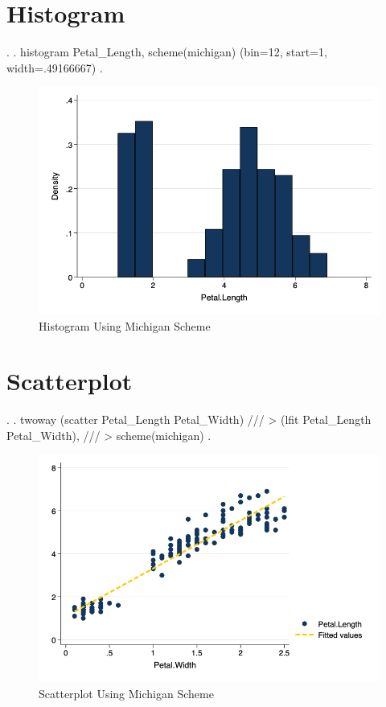 \documentclass[
]{article}
\begin{document}
\hypertarget{histogram}{%
\section{Histogram}\label{histogram}}

\begin{stlog}
. 
. histogram Petal_Length, scheme(michigan)
(bin=12, start=1, width=.49166667)
{\smallskip}
. 
\end{stlog}



\begin{figure}
\centering
\includegraphics[width=0.75\linewidth]{myhistogram.png}
\caption{Histogram Using Michigan Scheme}
\end{figure}

\hypertarget{scatterplot}{%
\section{Scatterplot}\label{scatterplot}}

\begin{stlog}
. 
. twoway (scatter Petal_Length Petal_Width) ///
> (lfit Petal_Length Petal_Width), ///
> scheme(michigan)
{\smallskip}
. 
\end{stlog}



\begin{figure}
\centering
\includegraphics[width=0.75\linewidth]{myscatter.png}
\caption{Scatterplot Using Michigan Scheme}
\end{figure}
\end{document}
